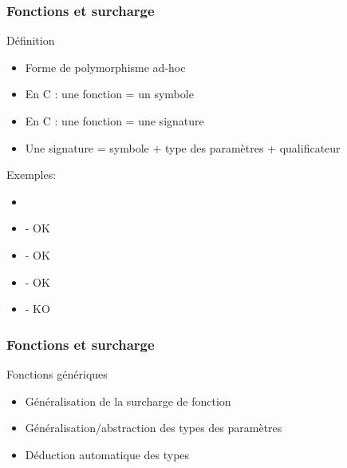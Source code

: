 \documentclass[svgnames]{beamer}
\def\C++{\textup{C}\nolinebreak[4]\hspace{-.05em}\raisebox{.4ex}{\relsize{-3}{\textbf{++}}}}
\begin{document}
\begin{frame}
  \frametitle{Fonctions et surcharge}
  \begin{block}{Définition}
  \begin{itemize}\footnotesize
  \item Forme de polymorphisme ad-hoc
  \item En C : une fonction = un symbole
  \item En \C++ : une fonction = une signature
  \item Une signature = symbole + type des paramètres + qualificateur
  \end{itemize}
  \end{block}

  \begin{block}{Exemples:}
  \begin{itemize}
  \item {}
  \item {} - OK
  \item {} - OK
  \item {} - OK
  \item {} - KO
  \end{itemize}
  \end{block}
\end{frame}

\begin{frame}
  \frametitle{Fonctions et surcharge}
  \begin{block}{Fonctions génériques}
  \begin{itemize}
  \item Généralisation de la surcharge de fonction
  \item Généralisation/abstraction des types des paramètres
  \item Déduction automatique des types
  \end{itemize}

  \end{block}
\end{frame}
\end{document}
